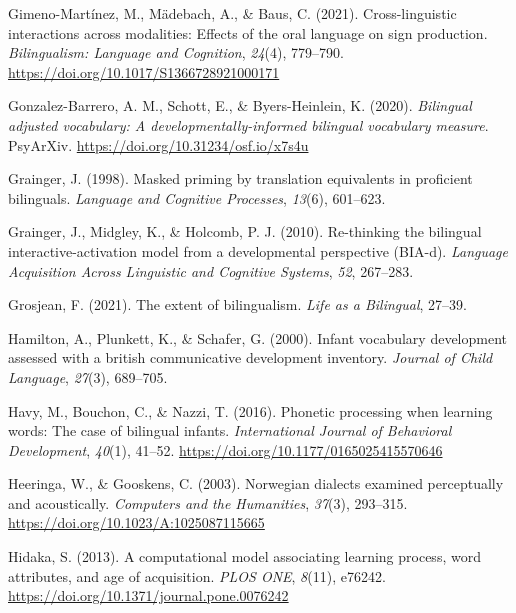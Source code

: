 \documentclass[
]{article}
\newlength{\cslhangindent}
\newlength{\cslentryspacingunit} %
\newenvironment{CSLReferences}[2] %
 {%
  \setlength{\parindent}{0pt}
  \ifodd #1
  \let\oldpar\par
  \def\par{\hangindent=\cslhangindent\oldpar}
  \fi
  \setlength{\parskip}{#2\cslentryspacingunit}
 }%
 {}
\begin{document}
\begin{CSLReferences}{1}{0}
\leavevmode{}%
Gimeno-Martínez, M., Mädebach, A., \& Baus, C. (2021). Cross-linguistic
interactions across modalities: Effects of the oral language on sign
production. \emph{Bilingualism: Language and Cognition}, \emph{24}(4),
779--790. \url{https://doi.org/10.1017/S1366728921000171}

\leavevmode{}%
Gonzalez-Barrero, A. M., Schott, E., \& Byers-Heinlein, K. (2020).
\emph{Bilingual adjusted vocabulary: A developmentally-informed
bilingual vocabulary measure}. {PsyArXiv}.
\url{https://doi.org/10.31234/osf.io/x7s4u}

\leavevmode{}%
Grainger, J. (1998). Masked priming by translation equivalents in
proficient bilinguals. \emph{Language and Cognitive Processes},
\emph{13}(6), 601--623.

\leavevmode{}%
Grainger, J., Midgley, K., \& Holcomb, P. J. (2010). Re-thinking the
bilingual interactive-activation model from a developmental perspective
(BIA-d). \emph{Language Acquisition Across Linguistic and Cognitive
Systems}, \emph{52}, 267--283.

\leavevmode{}%
Grosjean, F. (2021). The extent of bilingualism. \emph{Life as a
Bilingual}, 27--39.

\leavevmode{}%
Hamilton, A., Plunkett, K., \& Schafer, G. (2000). Infant vocabulary
development assessed with a british communicative development inventory.
\emph{Journal of Child Language}, \emph{27}(3), 689--705.

\leavevmode{}%
Havy, M., Bouchon, C., \& Nazzi, T. (2016). Phonetic processing when
learning words: The case of bilingual infants. \emph{International
Journal of Behavioral Development}, \emph{40}(1), 41--52.
\url{https://doi.org/10.1177/0165025415570646}

\leavevmode{}%
Heeringa, W., \& Gooskens, C. (2003). Norwegian dialects examined
perceptually and acoustically. \emph{Computers and the Humanities},
\emph{37}(3), 293--315. \url{https://doi.org/10.1023/A:1025087115665}

\leavevmode{}%
Hidaka, S. (2013). A computational model associating learning process,
word attributes, and age of acquisition. \emph{{PLOS} {ONE}},
\emph{8}(11), e76242. \url{https://doi.org/10.1371/journal.pone.0076242}


\end{CSLReferences}
\end{document}
